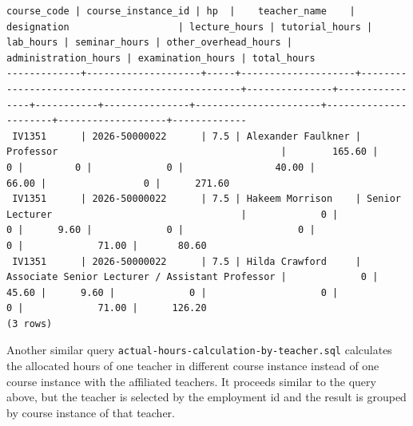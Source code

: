 \documentclass[a4paper]{scrartcl}
\renewcommand{\_}{\textunderscore\allowbreak}
\begin{document}
\begin{lstlisting}[style=output, caption={The output of \texttt{actual-hours-calculation-by-course.sql} for the course instance of IV1351}, label={lst:outbycourse}]
 course_code | course_instance_id | hp  |    teacher_name    |                   designation                   | lecture_hours | tutorial_hours | lab_hours | seminar_hours | other_overhead_hours | administration_hours | examination_hours | total_hours 
-------------+--------------------+-----+--------------------+-------------------------------------------------+---------------+----------------+-----------+---------------+----------------------+----------------------+-------------------+-------------
 IV1351      | 2026-50000022      | 7.5 | Alexander Faulkner | Professor                                       |        165.60 |              0 |         0 |             0 |                40.00 |                66.00 |                 0 |      271.60
 IV1351      | 2026-50000022      | 7.5 | Hakeem Morrison    | Senior Lecturer                                 |             0 |              0 |      9.60 |             0 |                    0 |                    0 |             71.00 |       80.60
 IV1351      | 2026-50000022      | 7.5 | Hilda Crawford     | Associate Senior Lecturer / Assistant Professor |             0 |          45.60 |      9.60 |             0 |                    0 |                    0 |             71.00 |      126.20
(3 rows)
\end{lstlisting}

Another similar query \texttt{actual-hours-calculation-by-teacher.sql} calculates the allocated hours of one teacher in different course instance instead of one course instance with the affiliated teachers. It proceeds similar to the query above, but the teacher is selected by the employment id and the result is grouped by course instance of that teacher.
\end{document}
